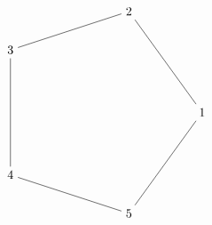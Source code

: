 \documentclass[../main.tex]{subfiles}
\begin{document}
\[
    \begin{tikzpicture}
        \def \n {5}
        \def \radius {3cm}
        \def \margin {8} %

        \foreach \s in {1,...,\n}
        {
        \node (\s) at ({360/\n * (\s - 1)}:\radius) {$\s$};
        }
        \draw (1) -- (2);
        \draw (2) -- (3);
        \draw (3) -- (4);
        \draw (4) -- (5);
        \draw (5) -- (1);
    \end{tikzpicture}
\]
\end{document}
